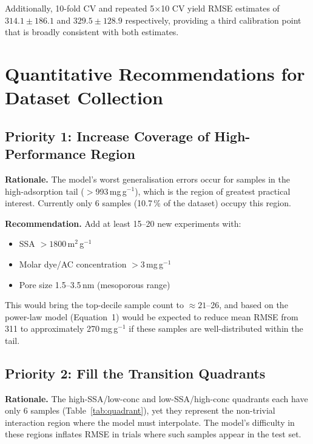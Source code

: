 \documentclass[12pt,a4paper]{article}
\begin{document}
Additionally, 10-fold CV and repeated 5$\times$10 CV yield RMSE estimates
of $314.1 \pm 186.1$ and $329.5 \pm 128.9$ respectively, providing a
third calibration point that is broadly consistent with both estimates.

\section{Quantitative Recommendations for Dataset Collection}
\label{sec:recommendations}

\subsection{Priority 1: Increase Coverage of High-Performance Region}

\textbf{Rationale.} The model's worst generalisation errors occur for
samples in the high-adsorption tail ($>$993\,mg\,g$^{-1}$), which is
the region of greatest practical interest.  Currently only 6 samples
(10.7\,\% of the dataset) occupy this region.

\textbf{Recommendation.} Add at least 15--20 new experiments with:
\begin{itemize}[leftmargin=*]
  \item SSA $> 1800$\,m$^2$\,g$^{-1}$
  \item Molar dye/AC concentration $> 3$\,mg\,g$^{-1}$
  \item Pore size 1.5--3.5\,nm (mesoporous range)
\end{itemize}
This would bring the top-decile sample count to $\approx 21$--26, and
based on the power-law model (Equation~1) would be expected to reduce
mean RMSE from 311 to approximately 270\,mg\,g$^{-1}$ if these samples
are well-distributed within the tail.

\subsection{Priority 2: Fill the Transition Quadrants}

\textbf{Rationale.} The high-SSA/low-conc and low-SSA/high-conc
quadrants each have only 6 samples (Table~\ref{tab:quadrant}), yet
they represent the non-trivial interaction region where the model must
interpolate.  The model's difficulty in these regions inflates RMSE in
trials where such samples appear in the test set.
\end{document}
